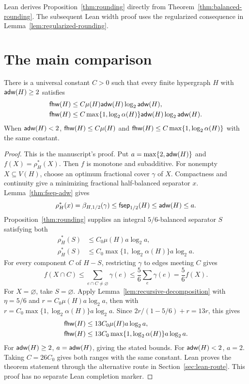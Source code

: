 Lean derives Proposition~\ref{thm:rounding} directly from
Theorem~\ref{thm:balanced-rounding}. The subsequent Lean width proof uses
the regularized consequence in Lemma~\ref{lem:regularized-rounding}.

\printbreak
\section{The main comparison}

\begin{theorem}[Theorem 1.1]
\label{thm:intro-width}
\leanok
There is a universal constant $C>0$ such that every finite hypergraph $H$
with $\mathsf{adw}(H)\ge2$ satisfies
\[
 \begin{aligned}
 \mathsf{fhw}(H)&\le C\mu(H)\mathsf{adw}(H)\log_2\mathsf{adw}(H),\\
 \mathsf{fhw}(H)&\le C\max\{1,\log_2\alpha(H)\}\mathsf{adw}(H)\log_2\mathsf{adw}(H).
 \end{aligned}
\]
When $\mathsf{adw}(H)<2$, $\mathsf{fhw}(H)\le C\mu(H)$ and
$\mathsf{fhw}(H)\le C\max\{1,\log_2\alpha(H)\}$ with the same constant.
\end{theorem}
\begin{proof}
This is the manuscript's proof. Put $a=\max\{2,\mathsf{adw}(H)\}$ and
$f(X)=\rho_H^*(X)$. Then $f$ is monotone and subadditive. For nonempty
$X\subseteq V(H)$, choose an optimum fractional cover $\gamma$ of $X$.
Compactness and continuity give a minimizing fractional half-balanced
separator $x$. Lemma~\ref{thm:fsep-adw} gives
\[
 \rho_H^*(x)=\beta_{H,1/2}(\gamma)
 \le\mathsf{fsep}_{1/2}(H)\le\mathsf{adw}(H)\le a.
\]
Proposition~\ref{thm:rounding} supplies an integral $5/6$-balanced
separator $S$ satisfying both
\[
 \begin{aligned}
 \rho_H^*(S)&\le C_0\mu(H)a\log_2 a,\\
 \rho_H^*(S)&\le C_0\max\{1,\log_2\alpha(H)\}a\log_2 a.
 \end{aligned}
\]
For every component $C$ of $H-S$, restricting $\gamma$ to edges meeting
$C$ gives
\[
 f(X\cap C)\le\sum_{e\cap C\ne\varnothing}\gamma(e)
 \le\frac56\sum_e\gamma(e)=\frac56 f(X).
\]
For $X=\varnothing$, take $S=\varnothing$.
Apply Lemma~\ref{lem:recursive-decomposition} with $\eta=5/6$ and
$r=C_0\mu(H)a\log_2 a$, then with
$r=C_0\max\{1,\log_2\alpha(H)\}a\log_2 a$.
Since $2r/(1-5/6)+r=13r$, this gives
\[
 \begin{aligned}
 \mathsf{fhw}(H)&\le13C_0\mu(H)a\log_2 a,\\
 \mathsf{fhw}(H)&\le13C_0\max\{1,\log_2\alpha(H)\}a\log_2 a.
 \end{aligned}
\]
For $\mathsf{adw}(H)\ge2$, $a=\mathsf{adw}(H)$, giving the stated bounds.
For $\mathsf{adw}(H)<2$, $a=2$. Taking $C=26C_0$ gives both ranges with
the same constant.
Lean proves the theorem statement through
the alternative route in Section~\ref{sec:lean-route}. This proof has no
separate Lean completion marker.
\end{proof}

